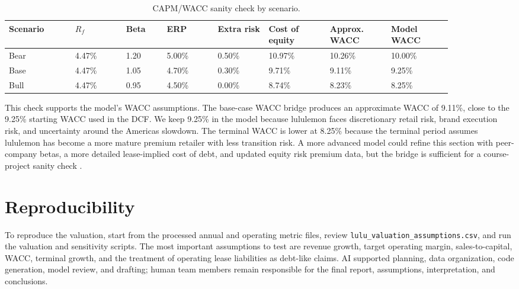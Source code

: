 \documentclass[a4paper]{CSMakotoTechnicalReport}
\begin{document}
\begin{appendices}
\begin{table}[H]
	\caption{CAPM/WACC sanity check by scenario.}
	\begin{tabular}{L{0.13\linewidth} R{0.10\linewidth} R{0.08\linewidth} R{0.10\linewidth} R{0.10\linewidth} R{0.12\linewidth} R{0.12\linewidth} R{0.12\linewidth}}
		\toprule
		\textbf{Scenario} & \textbf{$R_f$} & \textbf{Beta} & \textbf{ERP} & \textbf{Extra risk} & \textbf{Cost of equity} & \textbf{Approx. WACC} & \textbf{Model WACC} \\
		\midrule
		Bear & 4.47\% & 1.20 & 5.00\% & 0.50\% & 10.97\% & 10.26\% & 10.00\% \\
		Base & 4.47\% & 1.05 & 4.70\% & 0.30\% & 9.71\% & 9.11\% & 9.25\% \\
		Bull & 4.47\% & 0.95 & 4.50\% & 0.00\% & 8.74\% & 8.23\% & 8.25\% \\
		\bottomrule
	\end{tabular}
	\label{tab:waccsanity}
\end{table}

This check supports the model's WACC assumptions. The base-case WACC bridge produces an approximate WACC of 9.11\%, close to the 9.25\% starting WACC used in the DCF. We keep 9.25\% in the model because lululemon faces discretionary retail risk, brand execution risk, and uncertainty around the Americas slowdown. The terminal WACC is lower at 8.25\% because the terminal period assumes lululemon has become a more mature premium retailer with less transition risk. A more advanced model could refine this section with peer-company betas, a more detailed lease-implied cost of debt, and updated equity risk premium data, but the bridge is sufficient for a course-project sanity check \autocite{damodaranData}.

\section{Reproducibility}

To reproduce the valuation, start from the processed annual and operating metric files, review \texttt{lulu\_valuation\_assumptions.csv}, and run the valuation and sensitivity scripts. The most important assumptions to test are revenue growth, target operating margin, sales-to-capital, WACC, terminal growth, and the treatment of operating lease liabilities as debt-like claims. AI supported planning, data organization, code generation, model review, and drafting; human team members remain responsible for the final report, assumptions, interpretation, and conclusions.

\end{appendices}

\newpage
\begin{multicols}{2}
\printbibliography[title=Reference List]
\end{multicols}
\end{document}
